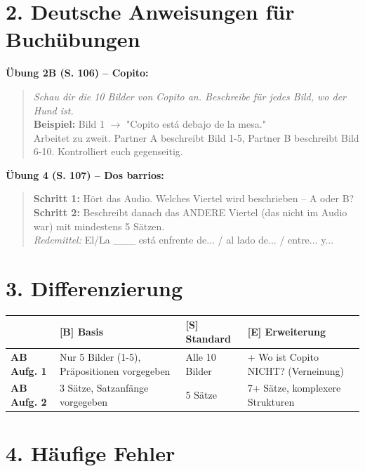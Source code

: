 \documentclass[11pt, a4paper]{article}
\newcommand{\B}{\textcolor{basis}{\textbf{[B]}}}
\newcommand{\Std}{\textcolor{standard}{\textbf{[S]}}}
\newcommand{\E}{\textcolor{erweiterung}{\textbf{[E]}}}
\begin{document}
\section*{2. Deutsche Anweisungen für Buchübungen}

\textbf{Übung 2B (S. 106) -- Copito:}
\begin{quote}
\textit{Schau dir die 10 Bilder von Copito an. Beschreibe für jedes Bild, wo der Hund ist.}\\
\textbf{Beispiel:} Bild 1 $\rightarrow$ "Copito está debajo de la mesa."\\
Arbeitet zu zweit. Partner A beschreibt Bild 1-5, Partner B beschreibt Bild 6-10. Kontrolliert euch gegenseitig.
\end{quote}

\textbf{Übung 4 (S. 107) -- Dos barrios:}
\begin{quote}
\textbf{Schritt 1:} Hört das Audio. Welches Viertel wird beschrieben -- A oder B?\\
\textbf{Schritt 2:} Beschreibt danach das ANDERE Viertel (das nicht im Audio war) mit mindestens 5 Sätzen.\\
\textit{Redemittel:} El/La \_\_\_ está enfrente de... / al lado de... / entre... y...
\end{quote}


\section*{3. Differenzierung}

\begin{tabularx}{\textwidth}{|l|X|X|X|}
\hline
& \B{} \textbf{Basis} & \Std{} \textbf{Standard} & \E{} \textbf{Erweiterung} \\
\hline
\textbf{AB Aufg. 1} & Nur 5 Bilder (1-5), Präpositionen vorgegeben & Alle 10 Bilder & + Wo ist Copito NICHT? (Verneinung) \\
\hline
\textbf{AB Aufg. 2} & 3 Sätze, Satzanfänge vorgegeben & 5 Sätze & 7+ Sätze, komplexere Strukturen \\
\hline
\end{tabularx}


\section*{4. Häufige Fehler}
\end{document}
